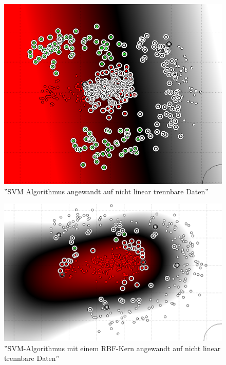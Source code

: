 \begin{figure}
\centering
\includegraphics[width=\textwidth,angle=90]{Bilder/svm-nonlinear-issue.png}
\caption{''SVM Algorithmus angewandt auf nicht linear trennbare Daten''}
\label{fig:SVM-NONLINEAR-ISSUE}
\end{figure}

\begin{figure}
\centering
\includegraphics[width=\textwidth,angle=90]{Bilder/svm-nonlinear-rbf.png}
\caption{''SVM-Algorithmus mit einem RBF-Kern angewandt auf nicht linear trennbare Daten''}
\label{fig:SVM-NONLINEAR-ISSUE}
\end{figure}

